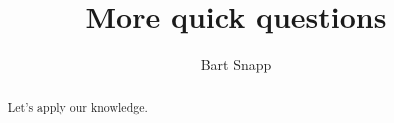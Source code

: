 \documentclass[handout,nooutcomes,noauthor]{ximera}
\title{More quick questions}
\author{Bart Snapp}
\begin{document}
\begin{abstract}
  Let's apply our knowledge.
\end{abstract}
\maketitle


\begin{listOutcomes}
\item 
\end{listOutcomes}


\mynewpage




\begin{question}
  
\end{question}

\mynewpage


\begin{question}
  
\end{question}

\mynewpage


\begin{question}
  
\end{question}
\end{document}
